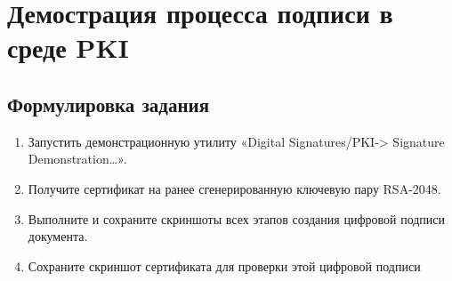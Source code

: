\documentclass[a4paper, 14pt]{extarticle}
\begin{document}
\section{Демострация процесса подписи в среде PKI}
\subsection{Формулировка задания}
\begin{enumerate}
    \item Запустить демонстрационную утилиту «Digital Signatures/PKI-> Signature Demonstration…».
    \item Получите сертификат на ранее сгенерированную ключевую пару RSA-2048.
    \item Выполните и сохраните скриншоты всех этапов создания цифровой подписи документа.
    \item Сохраните скриншот сертификата для проверки этой цифровой подписи
\end{enumerate}
\end{document}
